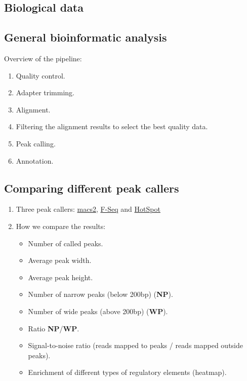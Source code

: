 \documentclass[11pt]{article}
\begin{document}
\subsection{Biological data}

\subsection{General bioinformatic analysis} Overview of the pipeline:
\begin{enumerate}
\itemsep0em 
  \item Quality control.
  \item Adapter trimming.
  \item Alignment.
  \item Filtering the alignment results to select the best quality data. 
  \item Peak calling.
  \item Annotation.
\end{enumerate}

\subsection{Comparing different peak callers}
\begin{enumerate}
\itemsep0em
  \item Three peak callers:
        \href{https://pypi.python.org/pypi/MACS2}{macs2}, 
        \href{http://fureylab.web.unc.edu/software/fseq/}{F-Seq} and 
        \href{http://www.uwencode.org/proj/hotspot-ptih/}{HotSpot}
  \item How we compare the results:
  \begin{itemize}
    \item Number of called peaks.
    \item Average peak width.
    \item Average peak height.
    \item Number of narrow peaks (below 200bp) (\textbf{NP}).
    \item Number of wide peaks (above 200bp) (\textbf{WP}).
    \item Ratio \textbf{NP}/\textbf{WP}.
    \item Signal-to-noise ratio (reads mapped to peaks / reads mapped
          outside peaks).
    \item Enrichment of different types of regulatory elements (heatmap).
  \end{itemize}
\end{enumerate}
\end{document}
